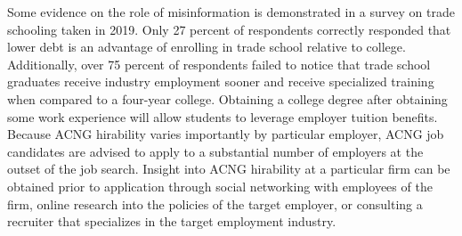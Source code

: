 \documentclass[review]{elsarticle}
\begin{document}
Some evidence on the role of misinformation is demonstrated in a survey on trade schooling taken in 2019\cite{arabia_2019}.
Only 27 percent of respondents correctly responded that lower debt is an advantage of enrolling in trade school relative to college.
Additionally, over 75 percent of respondents failed to notice that trade school graduates receive industry employment sooner
and receive specialized training when compared to a four-year college.
Obtaining a college degree after obtaining some work experience will allow students to leverage employer tuition benefits.
Because ACNG hirability varies importantly by particular employer, ACNG job candidates are advised to apply to a substantial number of employers at the outset of the job search.
Insight into ACNG hirability at a particular firm can be obtained prior to application through social networking with employees of the firm,
online research into the policies of the target employer,
or consulting a recruiter that specializes in the target employment industry.

\end{document}
